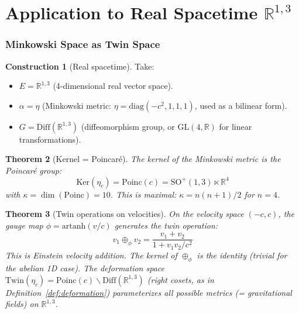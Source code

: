 \documentclass[12pt]{article}
\theoremstyle{plain}
\newtheorem{theorem}{Theorem}[section]
\theoremstyle{definition}
\newtheorem{construction}[theorem]{Construction}
\theoremstyle{remark}
\newcommand{\Ker}{\mathrm{Ker}}
\newcommand{\Twin}{\mathrm{Twin}}
\newcommand{\Poinc}{\mathrm{Poinc}}
\newcommand{\Diff}{\mathrm{Diff}}
\newcommand{\SO}{\mathrm{SO}}
\newcommand{\GL}{\mathrm{GL}}
\newcommand{\RR}{\mathbb{R}}
\begin{document}

\part{Application to Real Spacetime $\RR^{1,3}$}

\section{Minkowski Space as Twin Space}
\label{sec:minkowski}

\begin{construction}[Real spacetime]\label{constr:real}
Take:
\begin{itemize}
    \item $E = \RR^{1,3}$ (4-dimensional real vector space).
    \item $\alpha = \eta$ (Minkowski metric: $\eta = \mathrm{diag}(-c^2, 1, 1, 1)$, used as a bilinear form).
    \item $G = \Diff(\RR^{1,3})$ (diffeomorphism group, or $\GL(4,\RR)$ for linear transformations).
\end{itemize}
\end{construction}

\begin{theorem}[Kernel = Poincar\'e]\label{thm:poincare-kernel}
The kernel of the Minkowski metric is the Poincar\'e group:
\begin{equation}
\Ker(\eta_c) = \Poinc(c) = \SO^+(1,3) \ltimes \RR^4
\end{equation}
with $\kappa = \dim(\Poinc) = 10$. This is maximal: $\kappa = n(n+1)/2$ for $n = 4$.
\end{theorem}

\begin{theorem}[Twin operations on velocities]\label{thm:velocity-twin}
On the velocity space $(-c, c)$, the gauge map $\phi = \mathrm{artanh}(v/c)$ generates the twin operation:
\begin{equation}
v_1 \oplus_\phi v_2 = \frac{v_1 + v_2}{1 + v_1v_2/c^2}
\end{equation}
This is Einstein velocity addition. The kernel of $\oplus_\phi$ is the identity (trivial for the abelian 1D case). The deformation space $\Twin(\eta_c) = \Poinc(c)\backslash\Diff(\RR^{1,3})$ (right cosets, as in Definition~\ref{def:deformation}) parameterizes all possible metrics (= gravitational fields) on $\RR^{1,3}$.
\end{theorem}
\end{document}
